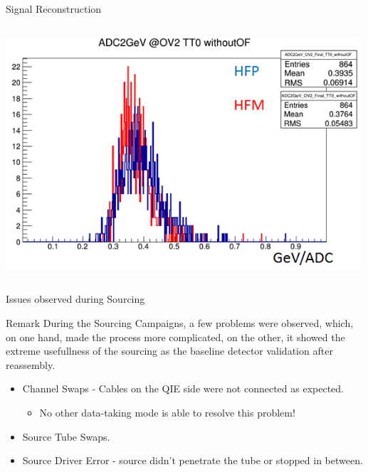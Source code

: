 \documentclass[pdf, 9pt]{beamer}
\begin{document}
\begin{frame}{Signal Reconstruction}
\begin{columns}[T]
\begin{column}{0.35\textwidth}
        \includegraphics[width=0.99\textwidth, height=0.3\textheight]{figs/sourcing/2014/ADC2GeV_OV2_TT0_withoutOF_FORDN.png}
      \end{column}
    \end{columns}
  \end{frame}

  \begin{frame}{Issues observed during Sourcing}
    \begin{block}{Remark}
      During the Sourcing Campaigns, a few problems were observed, which, on one hand, made the process more complicated, on the other, it showed the extreme usefullness of the sourcing as the baseline detector validation after reassembly.
    \end{block}
    \begin{itemize}
      \item Channel Swaps - Cables on the QIE side were not connected as expected.
        \begin{itemize}
          \item \alert{No other data-taking mode is able to resolve this problem!}
        \end{itemize}
      \item Source Tube Swaps.
      \item Source Driver Error - source didn't penetrate the tube or stopped in between.
    \end{itemize}
  \end{frame}
\end{document}
